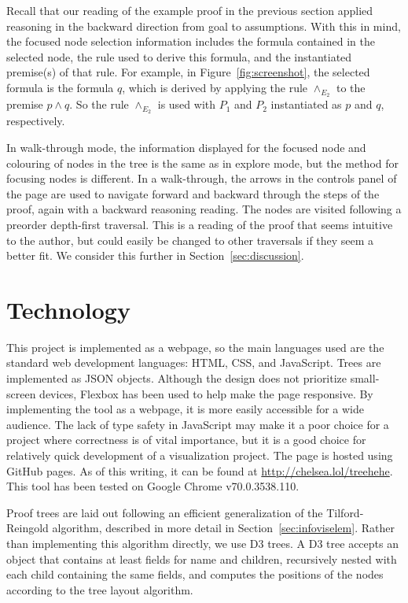 \documentclass[conference]{IEEEtran}
\begin{document}
Recall that our reading of the example proof in the previous section applied reasoning in the backward direction from goal to assumptions. With this in mind, the focused node selection information includes the formula contained in the selected node, the rule used to derive this formula, and the instantiated premise(s) of that rule. For example, in Figure~\ref{fig:screenshot}, the selected formula is the formula $q$, which is derived by applying the rule $\wedge_{E_2}$ to the premise $p \wedge q$. So the rule $\wedge_{E_2}$ is used with $P_1$ and $P_2$ instantiated as $p$ and $q$, respectively.

In walk-through mode, the information displayed for the focused node and colouring of nodes in the tree is the same as in explore mode, but the method for focusing nodes is different. In a walk-through, the arrows in the controls panel of the page are used to navigate forward and backward through the steps of the proof, again with a backward reasoning reading. The nodes are visited following a preorder depth-first traversal. This is a reading of the proof that seems intuitive to the author, but could easily be changed to other traversals if they seem a better fit. We consider this further in Section~\ref{sec:discussion}.


\section{Technology}
\label{sec:technology}

This project is implemented as a webpage, so the main languages used are the standard web development languages: HTML, CSS, and JavaScript. Trees are implemented as JSON objects. Although the design does not prioritize small-screen devices, Flexbox has been used to help make the page responsive. By implementing the tool as a webpage, it is more easily accessible for a wide audience. The lack of type safety in JavaScript may make it a poor choice for a project where correctness is of vital importance, but it is a good choice for relatively quick development of a visualization project. The page is hosted using GitHub pages. As of this writing, it can be found at \url{http://chelsea.lol/treehehe}. This tool has been tested on Google Chrome v70.0.3538.110.

Proof trees are laid out following an efficient generalization of the Tilford-Reingold algorithm, described in more detail in Section~\ref{sec:infoviselem}. Rather than implementing this algorithm directly, we use D3 trees. A D3 tree accepts an object that contains at least fields for name and children, recursively nested with each child containing the same fields, and computes the positions of the nodes according to the tree layout algorithm.
\end{document}
